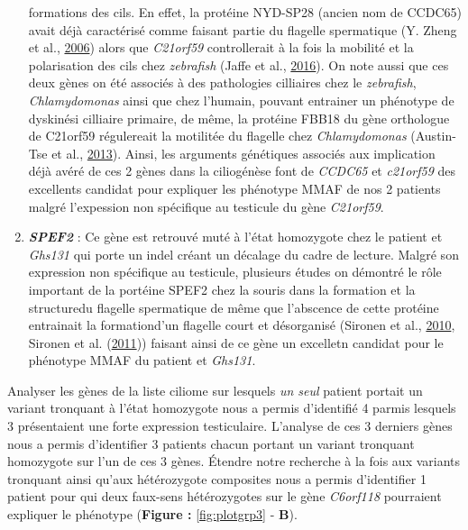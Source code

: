 \documentclass[12pt,twoside]{reedthesis}
\theoremstyle{definition}
\theoremstyle{definition}
\theoremstyle{remark}
\begin{document}
\begin{enumerate}
    formations des cils. En effet, la protéine NYD-SP28 (ancien nom de
    CCDC65) avait déjà caractérisé comme faisant partie du flagelle
    spermatique (Y. Zheng et al., \protect\hyperlink{ref-Zheng2006}{2006})
    alors que \emph{C21orf59} controllerait à la fois la mobilité et la
    polarisation des cils chez \emph{zebrafish} (Jaffe et al.,
    \protect\hyperlink{ref-Jaffe2016}{2016}). On note aussi que ces deux
    gènes on été associés à des pathologies cilliaires chez le
    \emph{zebrafish}, \emph{Chlamydomonas} ainsi que chez l'humain,
    pouvant entrainer un phénotype de dyskinési cilliaire primaire, de
    même, la protéine FBB18 du gène orthologue de C21orf59 régulereait la
    motilitée du flagelle chez \emph{Chlamydomonas} (Austin-Tse et al.,
    \protect\hyperlink{ref-Austin-Tse2013}{2013}). Ainsi, les arguments
    génétiques associés aux implication déjà avéré de ces 2 gènes dans la
    ciliogénèse font de \emph{CCDC65} et \emph{c21orf59} des excellents
    candidat pour expliquer les phénotype MMAF de nos 2 patients malgré
    l'expession non spécifique au testicule du gène \emph{C21orf59}.
  \item
    \textbf{\emph{SPEF2}} : Ce gène est retrouvé muté à l'état homozygote
    chez le patient et \emph{Ghs131} qui porte un indel créant un décalage
    du cadre de lecture. Malgré son expression non spécifique au
    testicule, plusieurs études on démontré le rôle important de la
    portéine SPEF2 chez la souris dans la formation et la structuredu
    flagelle spermatique de même que l'abscence de cette protéine
    entrainait la formationd'un flagelle court et désorganisé (Sironen et
    al., \protect\hyperlink{ref-Sironen2010}{2010}, Sironen et al.
    (\protect\hyperlink{ref-Sironen2011}{2011})) faisant ainsi de ce gène
    un excelletn candidat pour le phénotype MMAF du patient et
    \emph{Ghs131}.
  \end{enumerate}
  
  Analyser les gènes de la liste ciliome sur lesquels \emph{un seul}
  patient portait un variant tronquant à l'état homozygote nous a permis
  d'identifié 4 parmis lesquels 3 présentaient une forte expression
  testiculaire. L'analyse de ces 3 derniers gènes nous a permis
  d'identifier 3 patients chacun portant un variant tronquant homozygote
  sur l'un de ces 3 gènes. Étendre notre recherche à la fois aux variants
  tronquant ainsi qu'aux hétérozygote composites nous a permis
  d'identifier 1 patient pour qui deux faux-sens hétérozygotes sur le gène
  \emph{C6orf118} pourraient expliquer le phénotype (\textbf{Figure :}
  \ref{fig:plotgrp3} - \textbf{B}).
  
\end{document}
